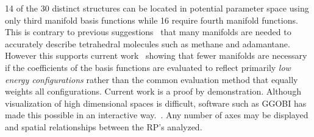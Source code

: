 \documentclass[preprint]{revtex4}
\newcommand{\mb}[1]{\ensuremath{\mbox{\boldmath $ #1 $}}}
\begin{document}
14 of the 30 distinct structures can be located in potential
parameter space using only third manifold basis functions while 16
require fourth manifold functions. This is contrary to previous
suggestions~\cite{Briels80} that many manifolds are needed to
accurately describe tetrahedral molecules such as methane and
adamantane. However this supports current work~\cite{Missaghi04}
showing that fewer manifolds are necessary if the coefficients of
the basis functions are evaluated to reflect primarily \emph{low
energy configurations} rather than the common evaluation method that
equally weights all configurations. Current work is a proof by
demonstration. Although visualization of high dimensional spaces is difficult,
software such as {G\footnotesize GOBI} has made this possible in an
interactive way.~\cite{ggobi03}.  Any number of axes may be displayed and
spatial relationships between the RP's analyzed.



\end{document}
